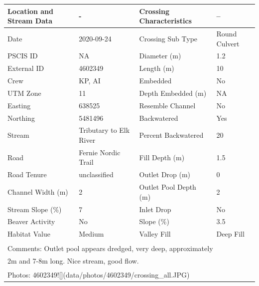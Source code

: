 \documentclass[
]{book}
\begin{document}
\begin{tabular}{l|l|l|l}
\hline
Location and Stream Data & - & Crossing Characteristics & --\\
\hline
Date & 2020-09-24 & Crossing Sub Type & Round Culvert\\
\hline
PSCIS ID & NA & Diameter (m) & 1.2\\
\hline
External ID & 4602349 & Length (m) & 10\\
\hline
Crew & KP, AI & Embedded & No\\
\hline
UTM Zone & 11 & Depth Embedded (m) & NA\\
\hline
Easting & 638525 & Resemble Channel & No\\
\hline
Northing & 5481496 & Backwatered & Yes\\
\hline
Stream & Tributary to Elk River & Percent Backwatered & 20\\
\hline
Road & Fernie Nordic Trail & Fill Depth (m) & 1.5\\
\hline
Road Tenure & unclassified & Outlet Drop (m) & 0\\
\hline
Channel Width (m) & 2 & Outlet Pool Depth (m) & 2\\
\hline
Stream Slope (\%) & 7 & Inlet Drop & No\\
\hline
Beaver Activity & No & Slope (\%) & 3.5\\
\hline
Habitat Value & Medium & Valley Fill & Deep Fill\\
\hline
\multicolumn{4}{l}{\textsuperscript{} Comments: Outlet pool appears dredged, very deep, approximately}\\
\multicolumn{4}{l}{2m and 7-8m long. Nice stream, good flow.}\\
\multicolumn{4}{l}{\textsuperscript{} Photos: 4602349![](data/photos/4602349/crossing\_all.JPG)}\\
\end{tabular}
\end{document}
